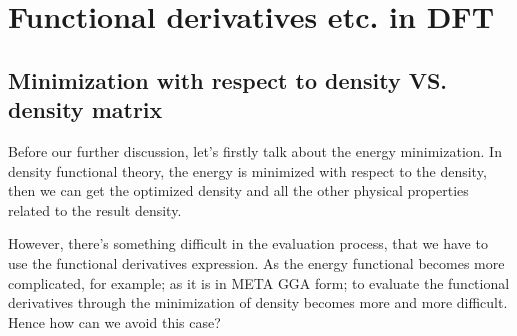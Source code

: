 \section{Functional derivatives etc. in DFT}
\label{sec:examples_functional_derivative}
%
%
%
%
\subsection{Minimization with respect to density VS. density matrix}
\label{sec:minimization_density_vs_density_matrix}
%
%
%
%
Before our further discussion, let's firstly talk about the energy
minimization. In density functional theory, the energy is minimized
with respect to the density, then we can get the optimized density
and all the other physical properties related to the result density.

However, there's something difficult in the evaluation process, that
we have to use the functional derivatives expression. As the energy
functional becomes more complicated, for example; as it is in META
GGA form; to evaluate the functional derivatives through the
minimization of density becomes more and more difficult. Hence how can
we avoid this case?

